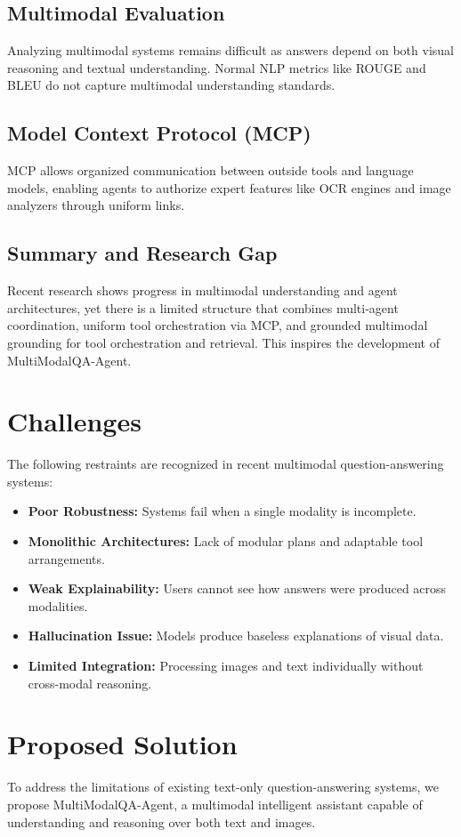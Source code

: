 \documentclass[conference]{IEEEtran}
\begin{document}
\subsection{Multimodal Evaluation}
Analyzing multimodal systems remains difficult as answers depend on both visual reasoning and textual understanding. Normal NLP metrics like ROUGE and BLEU do not capture multimodal understanding standards.

\subsection{Model Context Protocol (MCP)}
MCP allows organized communication between outside tools and language models, enabling agents to authorize expert features like OCR engines and image analyzers through uniform links.

\subsection{Summary and Research Gap}
Recent research shows progress in multimodal understanding and agent architectures, yet there is a limited structure that combines multi-agent coordination, uniform tool orchestration via MCP, and grounded multimodal grounding for tool orchestration and retrieval. This inspires the development of MultiModalQA-Agent.

\section{Challenges}
The following restraints are recognized in recent multimodal question-answering systems:
\begin{itemize}
    \item \textbf{Poor Robustness:} Systems fail when a single modality is incomplete.
    \item \textbf{Monolithic Architectures:} Lack of modular plans and adaptable tool arrangements.
    \item \textbf{Weak Explainability:} Users cannot see how answers were produced across modalities.
    \item \textbf{Hallucination Issue:} Models produce baseless explanations of visual data.
    \item \textbf{Limited Integration:} Processing images and text individually without cross-modal reasoning.
\end{itemize}

\section{Proposed Solution}
To address the limitations of existing text-only question-answering systems, we propose MultiModalQA-Agent, a multimodal intelligent assistant capable of understanding and reasoning over both text and images.
\end{document}
